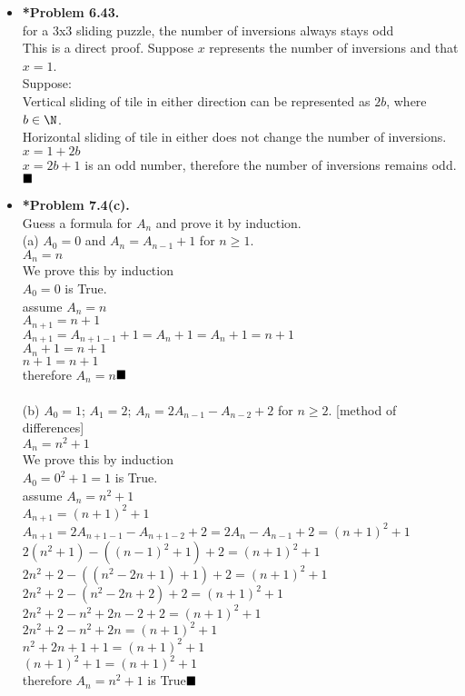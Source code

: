 \documentclass[11pt]{article}
\begin{document}
\begin{itemize}
\item \textbf{*Problem 6.43.} 
\\for a 3x3 sliding puzzle, the number of inversions always stays odd
\\This is a direct proof. Suppose $x$ represents the number of inversions and that $x = 1$.
\\Suppose:
\\Vertical sliding of tile in either direction can be represented as $2b$, where $b \in \N$.
\\Horizontal sliding of tile in either does not change the number of inversions.
\\$x = 1 + 2b$
\\$x = 2b + 1$ is an odd number, therefore the number of inversions remains odd.$\hfill\blacksquare$

\vspace{0.1in}

\item \textbf{*Problem 7.4(c).} 
\\Guess a formula for $A_n$ and prove it by induction.
\\(a)
$A_0=0$ and $A_n=A_{n-1}+1$ for $n \ge 1.$
\\$A_n=n$
\\We prove this by induction
\\$A_0=0$ is True.
\\assume $A_n=n$
\\$A_{n+1}=n+1$
\\$A_{n+1}=A_{n+1-1}+1=A_n+1=A_n+1=n+1$
\\$A_n+1=n+1$
\\$n+1=n+1$
\\therefore $A_n=n$$\hfill\blacksquare$
\\
\\(b)
$A_0=1$; $A_1=2$; $A_n=2A_{n-1}-A_{n-2}+2$ for $n \ge 2$. [method of differences]
\\$A_n=n^2+1$
\\We prove this by induction
\\$A_0=0^2+1=1$ is True.
\\assume $A_n=n^2+1$
\\$A_{n+1}=(n+1)^2+1$
\\$A_{n+1}=2A_{n+1-1}-A_{n+1-2}+2=2A_{n}-A_{n-1}+2=(n+1)^2+1$
\\$2(n^2+1)-((n-1)^2+1)+2=(n+1)^2+1$
\\$2n^2+2-((n^2-2n+1)+1)+2=(n+1)^2+1$
\\$2n^2+2-(n^2-2n+2)+2=(n+1)^2+1$
\\$2n^2+2-n^2+2n-2+2=(n+1)^2+1$
\\$2n^2+2-n^2+2n=(n+1)^2+1$
\\$n^2+2n+1+1=(n+1)^2+1$
\\$(n+1)^2+1=(n+1)^2+1$
\\therefore $A_n=n^2+1$ is True$\hfill\blacksquare$

\end{itemize}
\end{document}
